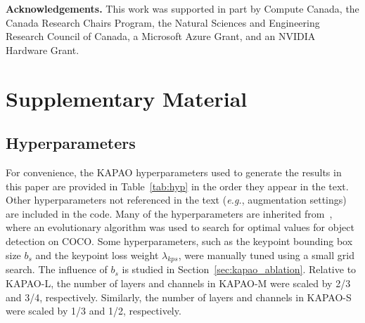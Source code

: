 \documentclass[runningheads]{llncs}
\newcommand{\eg}{\textit{e.g.}}
\begin{document}
{\bigskip\noindent\small\textbf{Acknowledgements.} This work was supported in part by Compute Canada, the Canada Research Chairs Program, the Natural Sciences and Engineering Research Council of Canada, a Microsoft Azure Grant, and an NVIDIA Hardware Grant.}







\clearpage
\appendix

\section{Supplementary Material}

\subsection{Hyperparameters}
For convenience, the KAPAO hyperparameters used to generate the results in this paper are provided in Table~\ref{tab:hyp} in the order they appear in the text. Other hyperparameters not referenced in the text (\eg, augmentation settings) are included in the code. Many of the hyperparameters are inherited from~\cite{glenn_jocher_2021_4679653}, where an evolutionary algorithm was used to search for optimal values for object detection on COCO. Some hyperparameters, such as the keypoint bounding box size $b_s$ and the keypoint loss weight $\lambda_{kps}$, were manually tuned using a small grid search. The influence of $b_s$ is studied in Section~\ref{sec:kapao_ablation}. Relative to KAPAO-L, the number of layers and channels in KAPAO-M were scaled by 2/3 and 3/4, respectively. Similarly, the number of layers and channels in KAPAO-S were scaled by 1/3 and 1/2, respectively.
\end{document}
